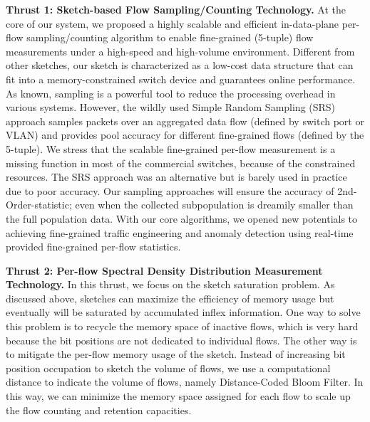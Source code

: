 \documentclass{NSF}
\newcommand{\BfPara}[1]{{\noindent\textbf{#1.}}\xspace}
\begin{document}
\BfPara{Thrust 1: Sketch-based Flow Sampling/Counting Technology}
At the core of our system, we proposed a highly scalable and efficient in-data-plane per-flow sampling/counting algorithm to enable fine-grained (5-tuple) flow measurements under a high-speed and high-volume environment. Different from other sketches, our sketch is characterized as a low-cost data structure that can fit into a memory-constrained switch device and guarantees online performance. As known, sampling is a powerful tool to reduce the processing overhead in various systems. However, the wildly used Simple Random Sampling (SRS) approach samples packets over an aggregated data flow (defined by switch port or VLAN) and provides pool accuracy for different fine-grained flows (defined by the 5-tuple). 
We stress that the scalable fine-grained per-flow measurement is a missing function in most of the commercial switches, because of the constrained resources. The SRS approach was an alternative but is barely used in practice due to poor accuracy. Our sampling approaches will ensure the accuracy of 2nd-Order-statistic; even when the collected subpopulation is dreamily smaller than the full population data. With our core algorithms, we opened new potentials to achieving fine-grained traffic engineering and anomaly detection using real-time provided fine-grained per-flow statistics. 


\BfPara{Thrust 2: Per-flow Spectral Density Distribution Measurement Technology} 
In this thrust, we focus on the sketch saturation problem. As discussed above, sketches can maximize the efficiency of memory usage but eventually will be saturated by accumulated inflex information. One way to solve this problem is to recycle the memory space of inactive flows, which is very hard because the bit positions are not dedicated to individual flows. The other way is to mitigate the per-flow memory usage of the sketch. Instead of increasing bit position occupation to sketch the volume of flows, we use a computational distance to indicate the volume of flows, namely Distance-Coded Bloom Filter. In this way, we can minimize the memory space assigned for each flow to scale up the flow counting and retention capacities.
\end{document}
